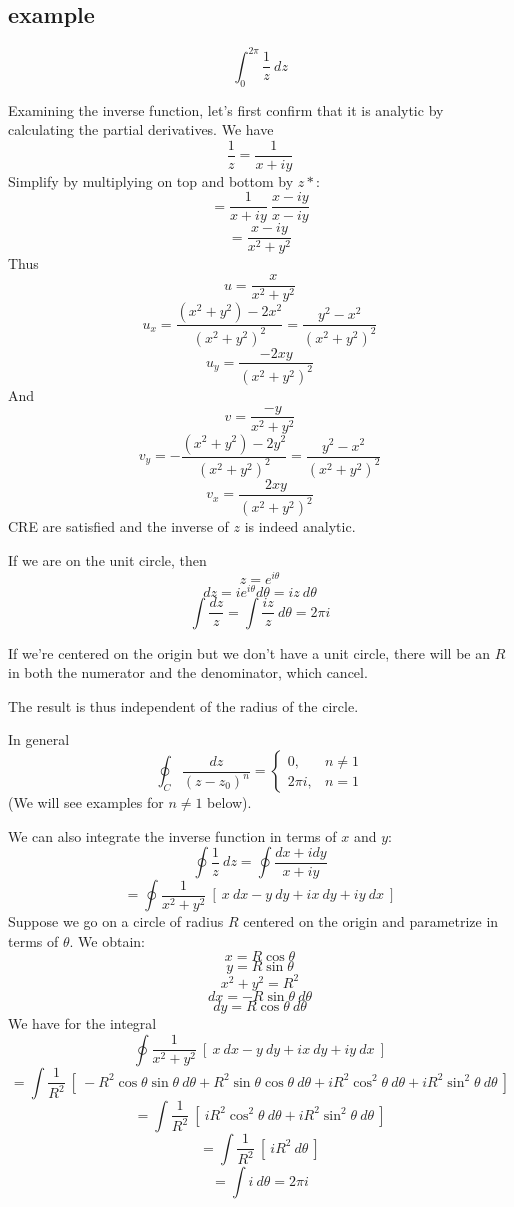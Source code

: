 \documentclass[11pt, oneside]{article}   	%
\begin{document}
\subsection*{example}
\[ \int_0^{2\pi} \frac{1}{z} \ dz \]

Examining the inverse function, let's first confirm that it is analytic by calculating the partial derivatives.  We have
\[ \frac{1}{z} = \frac{1}{x + iy} \]
Simplify by multiplying on top and bottom by $z*$:
\[ = \frac{1}{x + iy} \ \frac{x-iy}{x- iy} \]
\[ = \frac{x - iy}{x^2 + y^2} \]
Thus
\[ u = \frac{x}{x^2 + y^2} \]
\[ u_x = \frac{(x^2 + y^2) - 2x^2}{(x^2 + y^2)^2} = \frac{y^2 - x^2}{(x^2 + y^2)^2} \]
\[ u_y = \frac{-2xy}{(x^2 + y^2)^2} \]
And
\[ v =  \frac{-y}{x^2 + y^2} \]
\[ v_y = - \frac{(x^2 + y^2) - 2y^2}{(x^2 + y^2)^2} = \frac{y^2 - x^2}{(x^2 + y^2)^2} \]
\[ v_x = \frac{2xy}{(x^2 + y^2)^2} \]
CRE are satisfied and the inverse of $z$ is indeed analytic.

If we are on the unit circle, then 
\[ z = e^{i\theta} \]
\[ dz = ie^{i\theta} d \theta = iz\ d \theta \]
\[ \int \frac{dz}{z} = \int \frac{iz}{z} \ d \theta = 2 \pi i \]

If we're centered on the origin but we don't have a unit circle, there will be an $R$ in both the numerator and the denominator, which cancel.

The result is thus independent of the radius of the circle.

In general
\[ \oint_C \frac{dz}{(z - z_0)^n} = 
\begin{cases}
0, & n \ne 1 \\
2 \pi i, & n = 1 
\end {cases}
\]
(We will see examples for $n \ne 1$ below).

We can also integrate the inverse function in terms of $x$ and $y$:
\[ \oint \frac{1}{z} \ dz = \oint \frac{dx + i dy}{x + iy} \]
\[ = \oint \frac{1}{x^2+y^2} \ [ \  x \ dx - y \ dy + i x \ dy + i y \ dx \ ] \]
Suppose we go on a circle of radius $R$ centered on the origin and parametrize in terms of $\theta$.  We obtain:
\[ x = R \cos \theta \]
\[ y = R \sin \theta \]
\[ x^2 + y^2 = R^2 \]
\[ dx = - R \sin \theta \ d \theta \]
\[ dy = R \cos \theta \ d \theta \]
We have for the integral
\[ \oint \frac{1}{x^2+y^2} \ [ \  x \ dx - y \ dy + i x \ dy + i y \ dx \ ] \]
\[ = \int \frac{1}{R^2} \ [ \ -R^2 \cos \theta \sin \theta \ d \theta + R^2 \sin \theta \cos \theta \ d \theta + i R^2 \cos^2 \theta \ d \theta + i R^2 \sin^2 \theta \ d \theta \ ] \]
\[ = \int \frac{1}{R^2} \ [ \ i R^2 \cos^2 \theta \ d \theta + i R^2 \sin^2 \theta \ d \theta \ ] \]
\[ = \int \frac{1}{R^2} \ [ \ i R^2 \ d \theta \ ] \]
\[ = \int i \ d \theta = 2 \pi i \]
\end{document}
